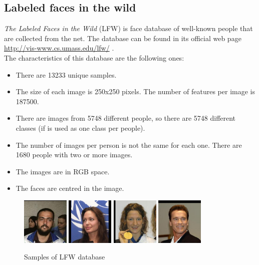 \subsection{Labeled faces in the wild}
\textit{The Labeled Faces in the Wild} (LFW) is face database of well-known people that are collected from the net. The database can be found in its official web page \url{http://vis-www.cs.umass.edu/lfw/} \cite{LFWTech}.\\

The characteristics of this database are the following ones:
\begin{itemize}
 \item There are 13233 unique samples.
 \item The size of each image is 250x250 pixels. The number of features per image is 187500.
 \item There are images from 5748 different people, so there are 5748 different classes (if is used as one class per people).
\item The number of images per person is not the same for each one. There are 1680 people with two or more images.
\item The images are in RGB space.
\item The faces are centred in the image.\\
\end{itemize}
\begin{figure}[htb]
\centering
\includegraphics[width=0.2\textwidth]{images_databases/LFW/1.jpg}
\includegraphics[width=0.2\textwidth]{images_databases/LFW/2.jpg}
\includegraphics[width=0.2\textwidth]{images_databases/LFW/3.jpg}
\includegraphics[width=0.2\textwidth]{images_databases/LFW/4.jpg}
\caption{Samples of LFW database} \label{fig:LFW1}
\end{figure}

